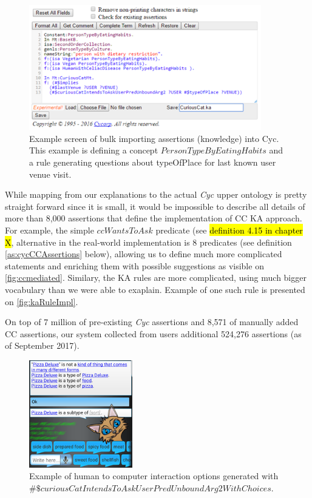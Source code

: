 \begin{figure}[H]
	\centering
		\includegraphics[width=0.9\textwidth]{figures/keEntry.png}
	\caption{Example screen of bulk importing assertions (knowledge) into Cyc.
This example is defining a concept $PersonTypeByEatingHabits$ and a rule 
generating questions about typeOfPlace for last known user venue visit.}
	\label{fig:ketext}
\end{figure}

While mapping from our explanations to the actual \emph{Cyc} upper ontology is 
pretty straight forward since it is small, it would be impossible to describe
all details of more than 8,000 assertions that define the implementation of
CC KA approach. For example, the simple $ccWantsToAsk$ predicate (see
\hl{definition 4.15 in chapter X}, alternative in the real-world implementation
is 8 predicates (see definition \ref{as:cycCCAssertions} below), allowing us to define much more complicated statements and
enriching them with possible suggestions as visible on \autoref{fig:ccmediated}.
Similary, the KA rules are more complicated, using much bigger vocabulary
than we were able to exaplain. Example of one such rule is presented on
\autoref{fig:kaRuleImpl}.

On top of 7 million of pre-existing \emph{Cyc} assertions and 8,571 of manually
added CC assertions, our system collected from users additional 524,276 
assertions (as of September 2017).

\begin{figure}[h]
	\centering
		\includegraphics[width=0.4\textwidth]{figures/androidMediated.png}
	\caption{Example of human to computer interaction options generated with
$\#\$curiousCatIntendsToAskUserPredUnboundArg2WithChoices$.}
	\label{fig:ccmediated}
\end{figure}

